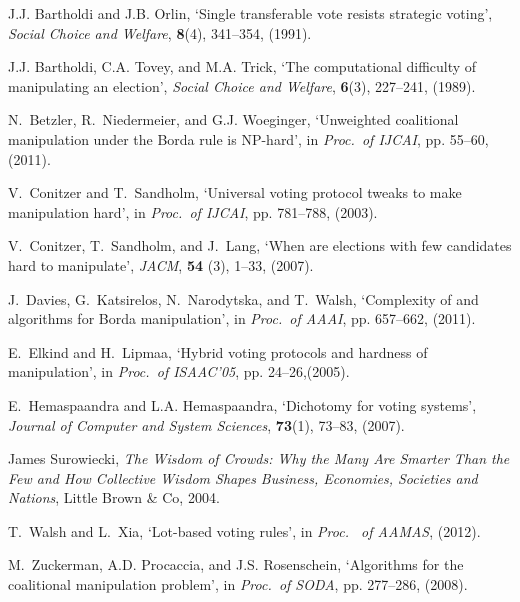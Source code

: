 \documentclass{ecai2012}
\begin{document}
\vspace{-1mm}
\begin{thebibliography}{10}

J.J. Bartholdi and J.B. Orlin, `Single transferable vote resists strategic
  voting', {\em Social Choice and Welfare}, {\bf 8}(4),  341--354, (1991).

J.J. Bartholdi, C.A. Tovey, and M.A. Trick, `The computational difficulty of
  manipulating an election', {\em Social Choice and Welfare}, {\bf 6}(3),
  227--241, (1989).

N.~Betzler, R.~Niedermeier, and G.J. Woeginger, `Unweighted coalitional
  manipulation under the {Borda} rule is {NP}-hard', in {\em Proc.~of
IJCAI}, pp. 55--60,
  (2011).

V.~Conitzer and T.~Sandholm, `Universal voting protocol tweaks to make
  manipulation hard', in {\em Proc.~of  IJCAI}, pp. 781--788,
 (2003).

V.~Conitzer, T.~Sandholm, and J.~Lang, `When are elections with few candidates
  hard to manipulate', {\em JACM}, {\bf 54} (3), 1--33, (2007).

J.~Davies, G.~Katsirelos, N.~Narodytska, and T.~Walsh, `Complexity of and
  algorithms for {Borda} manipulation', in {\em Proc.~of AAAI}, pp. 657--662, (2011).

E.~Elkind and H.~Lipmaa, `Hybrid voting protocols and hardness of
  manipulation', in {\em Proc.~of ISAAC'05}, pp. 24--26,(2005).

E.~Hemaspaandra and L.A. Hemaspaandra, `Dichotomy for voting systems', {\em
  Journal of Computer and System Sciences}, {\bf 73}(1),  73--83, (2007).

James Surowiecki, {\em The Wisdom of Crowds: Why the Many Are Smarter Than the
  Few and How Collective Wisdom Shapes Business, Economies, Societies and
  Nations}, Little Brown \& Co, 2004.

T.~Walsh and L.~Xia, `Lot-based voting rules', in {\em Proc.~ of AAMAS},
 (2012).

M.~Zuckerman, A.D. Procaccia, and J.S. Rosenschein, `Algorithms for the
  coalitional manipulation problem', in {\em Proc.~of SODA}, pp. 277--286, (2008).

\end{thebibliography}
\end{document}
